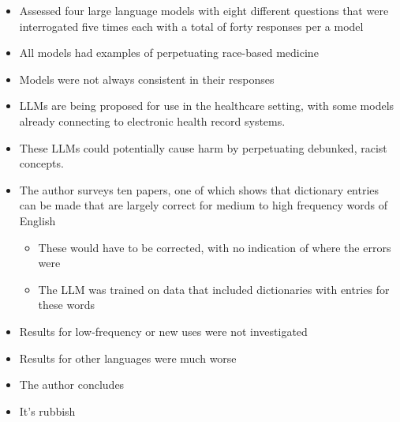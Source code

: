 \documentclass[25pt,a4paper,landscape,headrule,footrule,xetex]{foils}
\begin{document}
\begin{itemize}
\item Assessed four large language models with eight different questions that were
interrogated five times each with a total of forty responses per a model
\item All models had examples
of perpetuating race-based medicine
\item Models were not always consistent in
their responses 
\item  LLMs are being proposed for use in the healthcare setting, with
some models already connecting to electronic health record systems. 
\item These LLMs could potentially cause harm by perpetuating debunked,
racist concepts. 
\end{itemize}


\begin{itemize}\addtolength{\itemsep}{-1ex}
\item The author surveys ten papers, one of which shows that dictionary entries can be made that are largely correct for medium to high frequency words of English
  \begin{itemize}
  \item These would have to be corrected, with no indication of where the errors were
  \item The LLM was trained on data that included dictionaries with entries for these words
  \end{itemize}
\item Results for low-frequency or new uses were not investigated
\item Results for other languages were much worse
\item The author concludes 
\item It's rubbish
\end{itemize}
\end{document}
